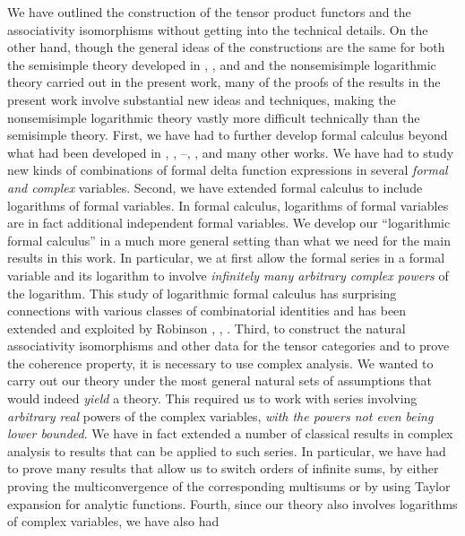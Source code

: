 \documentclass[12pt]{article}
\begin{document}
\begin{rema}\label{newinloggenerality}{\rm We have outlined the construction 
of the tensor product functors and the associativity isomorphisms
without getting into the technical details. On the other hand, though
the general ideas of the constructions are the same for both the
semisimple theory developed in \cite{tensor1}, \cite{tensor2},
\cite{tensor3} and \cite{tensor4} and the nonsemisimple logarithmic
theory carried out in the present work, many of the proofs of the
results in the present work involve substantial new ideas and
techniques, making the nonsemisimple logarithmic theory vastly more
difficult technically than the semisimple theory.  First, we have had
to further develop formal calculus beyond what had been developed in
\cite{FLM2}, \cite{FHL}, \cite{tensor1}--\cite{tensor3},
\cite{tensor4}, \cite{LL} and many other works.  We have had to study
new kinds of combinations of formal delta function expressions in
several {\it formal and complex} variables.  Second, we have extended
formal calculus to include logarithms of formal variables.  In formal
calculus, logarithms of formal variables are in fact additional
independent formal variables.  We develop our ``logarithmic formal
calculus'' in a much more general setting than what we need for the
main results in this work.  In particular, we at first allow the
formal series in a formal variable and its logarithm to involve {\it
infinitely many arbitrary complex powers} of the logarithm.  This
study of logarithmic formal calculus has surprising connections with
various classes of combinatorial identities and has been extended
and exploited by Robinson \cite{Ro1}, \cite{Ro2}, \cite{Ro3}.  Third,
to construct the natural associativity isomorphisms and other data for
the tensor categories and to prove the coherence property, it is
necessary to use complex analysis.  We wanted to carry out our theory
under the most general natural sets of assumptions that would indeed
{\it yield} a theory.  This required us to work with series involving
{\it arbitrary real} powers of the complex variables, {\it with the
powers not even being lower bounded}.  We have in fact extended a
number of classical results in complex analysis to results that can be
applied to such series.  In particular, we have had to prove many
results that allow us to switch orders of infinite sums, by either
proving the multiconvergence of the corresponding multisums or by
using Taylor expansion for analytic functions.  Fourth, since our
theory also involves logarithms of complex variables, we have also had
}
\end{rema}
\end{document}
